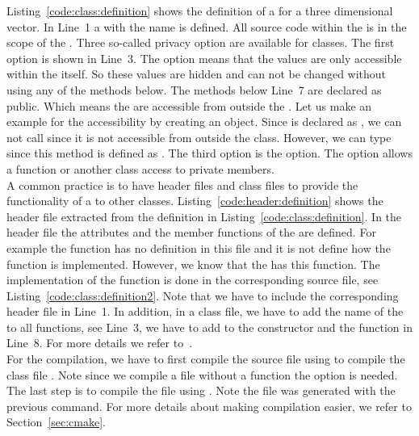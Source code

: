 Listing~\ref{code:class:definition} shows the definition of a  for a three dimensional vector. In Line~1 a  with the name  is defined. All source code within the \cpp{\{ \};} is in the scope of the . Three so-called privacy option are available for classes. The first option is shown in Line~3. The  option means that the  values are only accessible within the  itself. So these values are hidden and can not be changed without using any of the  methods below. The methods below Line~7 are declared as public. Which means the are accessible from outside the . Let us make an example for the accessibility by creating  an object. Since  is declared as , we can not call  since it is not accessible from outside the class. However, we can type  since this method is defined as . The third option is the  option. The  option allows a function or another class access to private members. \\

A common practice is to have header files and class files to provide the functionality of a  to other classes. Listing~\ref{code:header:definition} shows the header file extracted from the  definition in Listing~\ref{code:class:definition}. In the header file the attributes and the member functions of the  are defined. For example the function  has no definition in this file and it is not define how the function is implemented. However, we know that the  has this function. The implementation of the function is done in the corresponding source file, see Listing~\ref{code:class:definition2}. Note that we have to include the corresponding header file in Line~1. In addition, in a class file, we have to add the name of the  to all functions, see Line~3, we have to add  to the constructor and the function in Line~8. For more details we refer to~\cite[Chapter~9]{andrew2000accelerated}.\\

For the compilation, we have to first compile the source file using  to compile the class file . Note since we compile a file without a  function the option  is needed. The last step is to compile the  file using . Note the file  was generated with the previous command. For more details about making compilation easier, we refer to Section~\ref{sec:cmake}.


